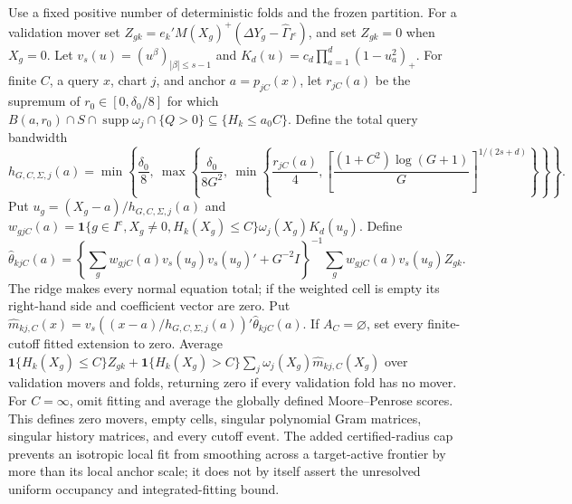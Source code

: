 Use a fixed positive number of deterministic folds and the frozen partition. For a validation mover set \(Z_{gk}=e_k'M(X_g)^+(\Delta Y_g-\widehat\Gamma_{I^c})\), and set \(Z_{gk}=0\) when \(X_g=0\). Let \(v_s(u)=(u^\beta)_{|\beta|\le s-1}\) and \(K_d(u)=c_d\prod_{a=1}^d(1-u_a^2)_+\). For finite \(C\), a query \(x\), chart \(j\), and anchor \(a=p_{jC}(x)\), let \(r_{jC}(a)\) be the supremum of \(r_0\in[0,\delta_0/8]\) for which \(B(a,r_0)\cap S\cap\operatorname{supp}\omega_j\cap\{Q>0\}\subseteq\{H_k\le a_0C\}\). Define the total query bandwidth \[h_{G,C,\Sigma,j}(a)=\min\left\{\frac{\delta_0}{8},\ \max\left\{\frac{\delta_0}{8G^2},\ \min\left\{\frac{r_{jC}(a)}4,\left[\frac{(1+C^2)\log(G+1)}G\right]^{1/(2s+d)}\right\}\right\}\right\}.\] Put \(u_g=(X_g-a)/h_{G,C,\Sigma,j}(a)\) and \(w_{gjC}(a)=\mathbf 1\{g\in I^c,X_g\ne0,H_k(X_g)\le C\}\omega_j(X_g)K_d(u_g)\). Define \[\widehat\theta_{kjC}(a)=\left\{\sum_gw_{gjC}(a)v_s(u_g)v_s(u_g)'+G^{-2}I\right\}^{-1}\sum_gw_{gjC}(a)v_s(u_g)Z_{gk}.\] The ridge makes every normal equation total; if the weighted cell is empty its right-hand side and coefficient vector are zero. Put \(\widehat m_{kj,C}(x)=v_s((x-a)/h_{G,C,\Sigma,j}(a))'\widehat\theta_{kjC}(a)\). If \(A_C=\varnothing\), set every finite-cutoff fitted extension to zero. Average \(\mathbf 1\{H_k(X_g)\le C\}Z_{gk}+\mathbf 1\{H_k(X_g)>C\}\sum_j\omega_j(X_g)\widehat m_{kj,C}(X_g)\) over validation movers and folds, returning zero if every validation fold has no mover. For \(C=\infty\), omit fitting and average the globally defined Moore--Penrose scores. This defines zero movers, empty cells, singular polynomial Gram matrices, singular history matrices, and every cutoff event. The added certified-radius cap prevents an isotropic local fit from smoothing across a target-active frontier by more than its local anchor scale; it does not by itself assert the unresolved uniform occupancy and integrated-fitting bound.